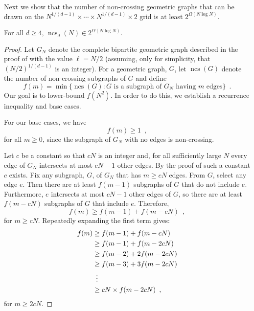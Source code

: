 \documentclass{patmorin}
\newcommand{\n}{N}
\DeclareMathOperator{\ncs}{ncs}
\begin{document}
Next we show that the number of non-crossing geometric graphs that can
be drawn on the $\n^{1/(d-1)}\times \cdots\times\n^{1/(d-1)}\times 2$
grid is at least $2^{\Omega(\n\log\n)}$.

\begin{thm}
  For all $d\ge 4$, $\ncs_d(\n) \in 2^{\Omega(\n\log\n)}$.
\end{thm}

\begin{proof}
  Let $G_\n$ denote the complete bipartite geometric graph described in
  the proof of  with the value $\ell=\n/2$ (assuming,
  only for simplicity, that $(\n/2)^{1/(d-1)}$ is an integer).  For a geometric
  graph, $G$, let $\ncs(G)$ denote the number of non-crossing subgraphs
  of $G$ and define
  \[
     f(m) = \min\{ \ncs(G) : 
                \mbox{$G$ is a subgraph of $G_{\n}$ having $m$ edges} \}
     \enspace . 
  \]
  Our goal is to lower-bound $f(\n^2)$.  In order to do this, we establish
  a recurrence inequality and base cases.
  
  For our base cases, we have 
  \[ 
     f(m)\ge 1 \enspace ,
  \]
  for all $m\ge 0$, since the subgraph of $G_{\n}$ with no edges is
  non-crossing.
  
  Let $c$ be a constant so that $c\n$ is an integer and, for all
  sufficiently large $\n$ every edge of $G_\n$ intersects at most $c\n-1$
  other edges.  By the proof of  such a constant
  $c$ exists.  Fix any subgraph, $G$, of $G_{\n}$ that has $m\ge c\n$ edges.
  From $G$, select any edge $e$. Then there are at least $f(m-1)$
  subgraphs of $G$ that do not include $e$.  Furthermore, $e$ intersects
  at most $c\n-1$ other edges of $G$, so there are at least $f(m-c\n)$
  subgraphs of $G$ that include $e$.  Therefore,
  \[  
     f(m) \ge f(m-1) + f(m-c\n) \enspace ,
  \]
  for $m\ge c\n$.  Repeatedly expanding the first term gives:
  \begin{align}
  f(m) & \ge  f(m-1) + f(m-c\n) \notag \\
         & \ge  f(m-1) + f(m-2c\n) \notag \\
         & \ge  f(m-2) + 2f(m-2c\n) \notag \\
         & \ge  f(m-3) + 3f(m-2c\n) \notag \\
         & \,\,\,\vdots  \notag \\
         & \ge  c\n\times f(m-2c\n) \enspace , \eqlabel{blech}
  \end{align}
  for $m\ge 2c\n$.
  

\end{proof}
\end{document}
